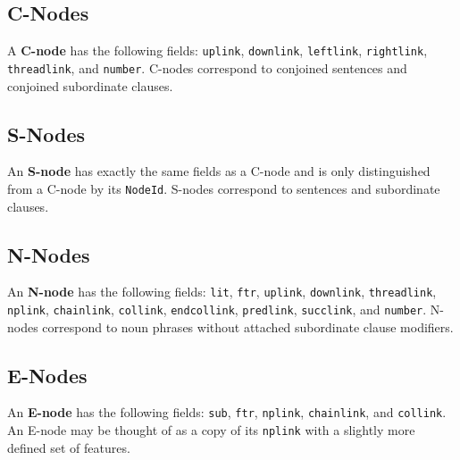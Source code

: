 \documentclass{article}
\begin{document}

\subsection{C-Nodes}

A \textbf{C-node} has the following fields: \texttt{uplink},
\texttt{downlink}, \texttt{leftlink}, \texttt{rightlink},
\texttt{threadlink}, and \texttt{number}. C-nodes correspond to
conjoined sentences and conjoined subordinate clauses.


\subsection{S-Nodes}

An \textbf{S-node} has exactly the same fields as a C-node and
is only distinguished from a C-node by its
\texttt{NodeId}. S-nodes correspond to sentences and subordinate
clauses.


\subsection{N-Nodes}

An \textbf{N-node} has the following fields: \texttt{lit},
\texttt{ftr}, \texttt{uplink}, \texttt{downlink},
\texttt{threadlink}, \texttt{nplink}, \texttt{chainlink},
\texttt{collink}, \texttt{endcollink}, \texttt{predlink},
\texttt{succlink}, and \texttt{number}. N-nodes correspond to
noun phrases without attached subordinate clause modifiers.


\subsection{E-Nodes}

An \textbf{E-node} has the following fields: \texttt{sub},
\texttt{ftr}, \texttt{nplink}, \texttt{chainlink}, and
\texttt{collink}. An E-node may be thought of as a copy of its
\texttt{nplink} with a slightly more defined set of features.
\end{document}

